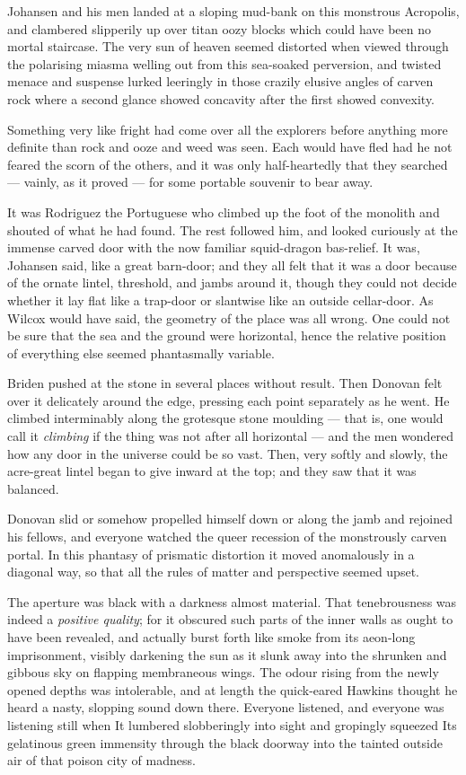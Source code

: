 \begin{pages}
\begin{Leftside}
Johansen and his men landed at a sloping mud-bank on this monstrous
Acropolis, and clambered slipperily up over titan oozy blocks which
could have been no mortal staircase. The very sun of heaven seemed
distorted when viewed through the polarising miasma welling out from
this sea-soaked perversion, and twisted menace and suspense lurked
leeringly in those crazily elusive angles of carven rock where a second
glance showed concavity after the first showed convexity.

Something very like fright had come over all the explorers before
anything more definite than rock and ooze and weed was seen. Each would
have fled had he not feared the scorn of the others, and it was only
half-heartedly that they searched --- vainly, as it proved --- for some
portable souvenir to bear away.

It was Rodriguez the Portuguese who climbed up the foot of the monolith
and shouted of what he had found. The rest followed him, and looked
curiously at the immense carved door with the now familiar squid-dragon
bas-relief. It was, Johansen said, like a great barn-door; and they all
felt that it was a door because of the ornate lintel, threshold, and
jambs around it, though they could not decide whether it lay flat like a
trap-door or slantwise like an outside cellar-door. As Wilcox would have
said, the geometry of the place was all wrong. One could not be sure
that the sea and the ground were horizontal, hence the relative position
of everything else seemed phantasmally variable.

Briden pushed at the stone in several places without result. Then
Donovan felt over it delicately around the edge, pressing each point
separately as he went. He climbed interminably along the grotesque stone
moulding --- that is, one would call it \emph{climbing} if the thing was not
after all horizontal --- and the men wondered how any door in the universe
could be so vast. Then, very softly and slowly, the acre-great lintel
began to give inward at the top; and they saw that it was balanced.

Donovan slid or somehow propelled himself down or along the jamb and
rejoined his fellows, and everyone watched the queer recession of the
monstrously carven portal. In this phantasy of prismatic distortion it
moved anomalously in a diagonal way, so that all the rules of matter and
perspective seemed upset.

The aperture was black with a darkness almost material. That
tenebrousness was indeed a \emph{positive quality}; for it obscured such parts
of the inner walls as ought to have been revealed, and actually burst
forth like smoke from its aeon-long imprisonment, visibly darkening the
sun as it slunk away into the shrunken and gibbous sky on flapping
membraneous wings. The odour rising from the newly opened depths was
intolerable, and at length the quick-eared Hawkins thought he heard a
nasty, slopping sound down there. Everyone listened, and everyone was
listening still when It lumbered slobberingly into sight and gropingly
squeezed Its gelatinous green immensity through the black doorway into
the tainted outside air of that poison city of madness.


\end{Leftside}
\end{pages}
